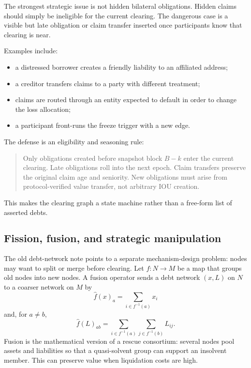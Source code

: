\documentclass[11pt,oneside]{article}
\begin{document}
The strongest strategic issue is not hidden bilateral obligations. Hidden claims
should simply be ineligible for the current clearing. The dangerous case is a
visible but late obligation or claim transfer inserted once participants know
that clearing is near.

Examples include:

\begin{itemize}[leftmargin=1.5em]
  \item a distressed borrower creates a friendly liability to an affiliated
  address;
  \item a creditor transfers claims to a party with different treatment;
  \item claims are routed through an entity expected to default in order to
  change the loss allocation;
  \item a participant front-runs the freeze trigger with a new edge.
\end{itemize}

The defense is an eligibility and seasoning rule:

\begin{quote}
Only obligations created before snapshot block $B-k$ enter the current
clearing. Late obligations roll into the next epoch. Claim transfers preserve
the original claim age and seniority. New obligations must arise from
protocol-verified value transfer, not arbitrary IOU creation.
\end{quote}

This makes the clearing graph a state machine rather than a free-form list of
asserted debts.

\subsection{Fission, fusion, and strategic manipulation}

The old debt-network note points to a separate mechanism-design problem: nodes
may want to split or merge before clearing. Let $f:N\to M$ be a map that groups
old nodes into new nodes. A fusion operator sends a debt network $(x,L)$ on
$N$ to a coarser network on $M$ by
\[
  \widehat f(x)_a=\sum_{i\in f^{-1}(a)}x_i
\]
and, for $a\neq b$,
\[
  \widehat f(L)_{ab}
  =
  \sum_{i\in f^{-1}(a)}\sum_{j\in f^{-1}(b)} L_{ij}.
\]
Fusion is the mathematical version of a rescue consortium: several nodes pool
assets and liabilities so that a quasi-solvent group can support an insolvent
member. This can preserve value when liquidation costs are high.
\end{document}
